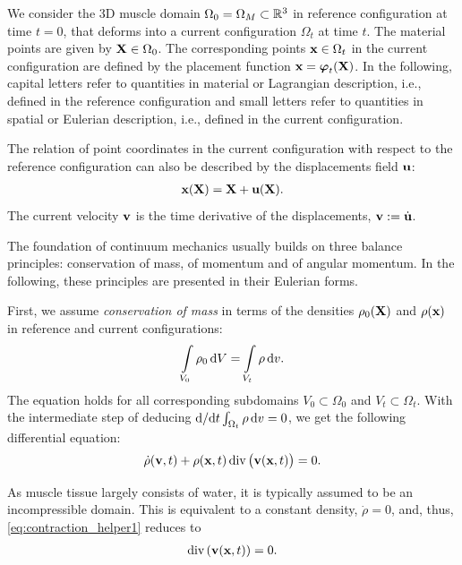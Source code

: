 We consider the 3D muscle domain $\Omega_0=\Omega_M \subset \mathbb{R}^3$ in reference configuration at time $t=0$, that deforms into a current configuration $\Omega_t$ at time $t$. The material points are given by $\textbf{X} \in \Omega_0$. The corresponding points $\textbf{x} \in \Omega_t$ in the current configuration are defined by the placement function $\textbf{x} = \boldsymbol{\varphi}_t(\textbf{X})$. In the following, capital letters refer to quantities in material or Lagrangian description, i.e., defined in the reference configuration and small letters refer to quantities in spatial or Eulerian description, i.e., defined in the current configuration.

The relation of point coordinates in the current configuration with respect to the reference configuration can also be described by the displacements field $\textbf{u}$:
\begin{align*}
  \textbf{x}(\textbf{X}) = \textbf{X} + \textbf{u}(\textbf{X}).
\end{align*}
The current velocity $\textbf{v}$ is the time derivative of the displacements, $\textbf{v} := \dot{\textbf{u}}$.

The foundation of continuum mechanics usually builds on three balance principles: conservation of mass, of momentum and of angular momentum. In the following, these principles are presented in their Eulerian forms.

First, we assume \emph{conservation of mass} in terms of the densities $\rho_0(\textbf{X})$ and $\rho(\textbf{x})$ in reference and current configurations:
%
\begin{align*}
  \ds\int\limits_{V_0} \rho_0\,\d V = \int\limits_{V_t} \rho \,\d v.
\end{align*}
%
The equation holds for all corresponding subdomains $V_0\subset \Omega_0$ and $V_t \subset \Omega_t$. With the intermediate step of deducing $\d/\d t \int_{\Omega_t} \rho \,\d v=0$, we get the following differential equation:%
\begin{align}\label{eq:contraction_helper1}
  \dot{\rho}(\textbf{v},t) + \rho(\textbf{x},t)\,\hbox{div} \,\big(\textbf{v}(\textbf{x},t)\big) = 0.
\end{align}
%

As muscle tissue largely consists of water, it is typically assumed to be an incompressible domain. This is equivalent to a constant density, $\dot{\rho}=0$, and, thus, \cref{eq:contraction_helper1} reduces to
%
\begin{align}\label{eq:assumption_1_local}
  \hbox{div} \,(\textbf{v}(\textbf{x},t)) = 0.
\end{align}
%

